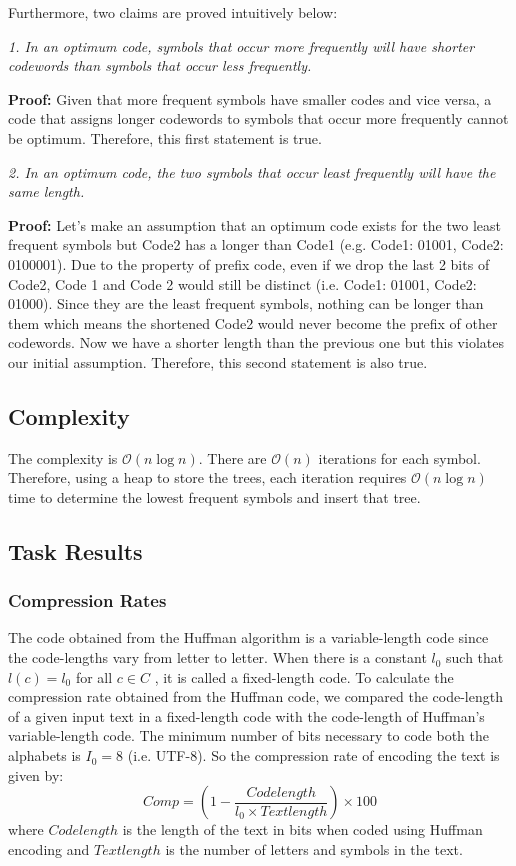 \documentclass[12pt, authoryear]{elsarticle}
\begin{document}
Furthermore, two claims are proved intuitively below: 

\textit{1. In an optimum code, symbols that occur more frequently will have shorter codewords than symbols that occur less frequently.}

\textbf{Proof:} Given that more frequent symbols have smaller codes and vice versa, a code that assigns longer codewords to symbols that occur more frequently cannot be optimum. Therefore, this first  statement is true.

\textit{2. In an optimum code, the two symbols that occur least frequently will have the same length.}

\textbf{Proof:} Let’s make an assumption that an optimum code exists for the two least frequent symbols but Code2 has a longer than Code1 (e.g. Code1: 01001, Code2: 0100001). Due to the property of prefix code, even if we drop the last 2 bits of Code2, Code 1 and Code 2 would still be distinct (i.e. Code1: 01001, Code2: 01000). Since they are the least frequent symbols, nothing can be longer than them which means the shortened Code2 would never become the prefix of other codewords. Now we have a shorter length than the previous one but this violates our initial assumption. Therefore, this second statement is also true.

\subsection{Complexity}

The complexity is  $\mathcal{O}(n \log n)$. There are  $\mathcal{O}(n)$ iterations for each symbol. Therefore, using a heap to store the trees, each iteration requires  $\mathcal{O}(n \log n)$ time to determine the lowest frequent symbols and insert that tree. 

\subsection{Task Results}

\subsubsection{Compression Rates}

The code obtained from the Huffman algorithm is a variable-length code since the code-lengths vary from letter to letter. When there is a constant $l_0$ such that $l(c) = l_0$ for all $c \in C$ , it is called a fixed-length code. To calculate the compression rate obtained from the Huffman code, we compared the code-length of a given input text in a fixed-length code with the code-length of Huffman's variable-length code. The minimum number of bits necessary to code both the alphabets is $I_0 = 8 $ (i.e. UTF-8). So the compression rate of encoding the text is given by:
\[
 { Comp }  = \left( 1 - \frac {  { Codelength } } { l _ { 0 } \times  { Textlength } } \right) \times 100
\]
where $Codelength$ is the length of the text in bits when coded using Huffman encoding and $Textlength$ is the number of letters and symbols in the text.
\end{document}
